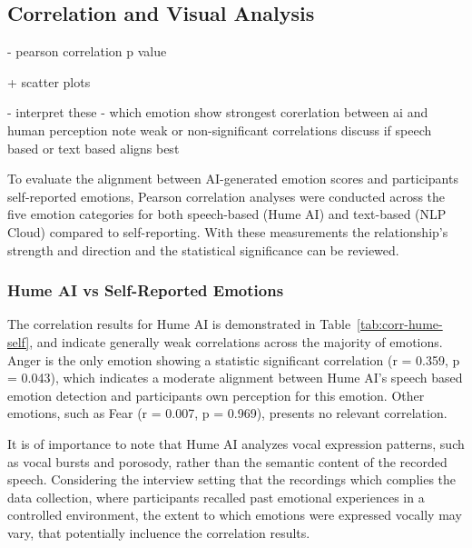 \subsection{Correlation and Visual Analysis}
- pearson correlation p value 

+ scatter plots 

- interpret these 
- which emotion show strongest corerlation between ai and human perception 
note weak or non-significant correlations 
discuss if speech based or text based aligns best 

To evaluate the alignment between AI-generated emotion scores and participants self-reported emotions, 
Pearson correlation analyses were conducted across the five emotion categories for both speech-based (Hume AI) and text-based (NLP Cloud) compared to self-reporting.
With these measurements the relationship's strength and direction and the statistical significance can be reviewed. 

\subsubsection{Hume AI vs Self-Reported Emotions}
The correlation results for Hume AI is demonstrated in Table~\ref{tab:corr-hume-self}, and indicate generally weak correlations across the majority of emotions. 
Anger is the only emotion showing a statistic significant correlation (r = 0.359, p = 0.043), which indicates a moderate alignment between Hume AI's speech based emotion 
detection and participants own perception for this emotion. Other emotions, such as Fear (r = 0.007, p = 0.969), presents no relevant correlation. 

It is of importance to note that Hume AI analyzes vocal expression patterns, such as vocal bursts and porosody, rather than the semantic content of the recorded speech. 
Considering the interview setting that the recordings which complies the data collection, where participants recalled past emotional experiences in a controlled environment, 
the extent to which emotions were expressed vocally may vary, that potentially incluence the correlation results. 


